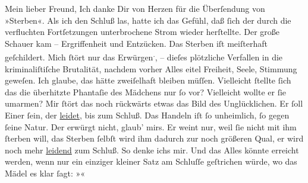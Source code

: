 \begin{ledgroupsized}[t]{13cm}
           \pstart\center{}Mein lieber Freund,\pend\pstart
           Ich danke Dir von Herzen für die Überſendung von »Sterben«. Als ich den Schluß las, hatte ich das Gefühl, daß ſich der durch die verfluchten
               Fortſetzungen unterbrochene Strom wieder herſtellte. Der große Schauer kam –
               Ergriffenheit und Entzücken. Das Sterben iſt meiſterhaft geſchildert. Mich ſtört nur
               das Erwürgen\substVorne{}\textsuperscript{.}\substDazwischen{},\substHinten{} – dieſes plötzliche Verfallen in die kriminaliſtiſche Brutalität, nachdem
                   vorher 
               Alles eitel Freiheit, Seele, Stimmung geweſen. Ich glaube, das {\pb}hätte zweiſelhaft bleiben müſſen. Vielleicht ſtellte
               ſich das die überhitzte Phantaſie des Mädchens \introOben{}nur\introOben{} ſo vor?
               Vielleicht wollte er ſie umarmen? Mir ſtört das noch rückwärts etwas das Bild des
               Unglücklichen. Er ſoll Einer ſein, der \uline{leidet}, bis
               zum Schluß. Das Handeln iſt ſo unheimlich, ſo gegen ſeine Natur. Der erwürgt nicht,
               glaub’ mirs. Er weint nur, weil ſie nicht mit ihm ſterben will, das Sterben ſelbſt
               wird ihm dadurch zur noch größeren Qual, er wird noch mehr \uline{leidend} zum Schluß. So denke ichs mir. Und {\pb}das Alles könnte erreicht werden, wenn nur ein einziger kleiner Satz am Schluſſe
               geſtrichen würde, wo das Mädel es klar ſagt: »\label{K_L02622_1v}\label{K_L02622_1h}«\pend
           \pstart

\end{ledgroupsized}
